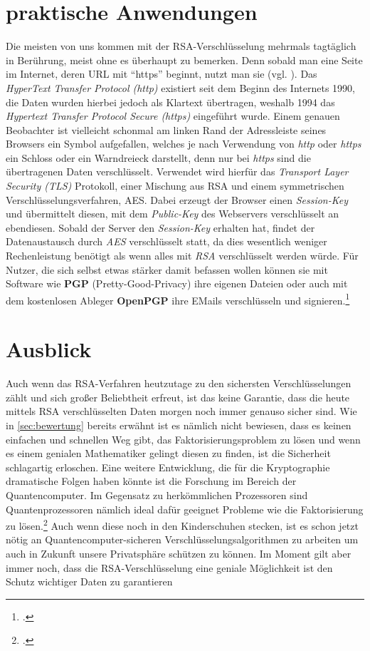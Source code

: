 \documentclass{scrarticle}
\begin{document}
    \section{praktische Anwendungen}
        Die meisten von uns kommen mit der RSA-Verschlüsselung mehrmals tagtäglich in Berührung, meist ohne es überhaupt zu bemerken. Denn sobald man eine Seite im Internet, deren URL mit \enquote{https} beginnt, nutzt man sie (vgl. \cite{httpsblog}). Das \emph{HyperText Transfer Protocol (http)} existiert seit dem Beginn des Internets 1990, die Daten wurden hierbei jedoch als Klartext übertragen, weshalb 1994 das \emph{Hypertext Transfer Protocol Secure (https)} eingeführt wurde. Einem genauen Beobachter ist vielleicht schonmal am linken Rand der Adressleiste seines Browsers ein Symbol aufgefallen, welches je nach Verwendung von \emph{http} oder \emph{https} ein Schloss oder ein Warndreieck darstellt, denn nur bei \emph{https} sind die übertragenen Daten verschlüsselt. Verwendet wird hierfür das \emph{Transport Layer Security (TLS)} Protokoll, einer Mischung aus RSA und einem symmetrischen Verschlüsselungsverfahren, AES. Dabei erzeugt der Browser einen \emph{Session-Key} und übermittelt diesen, mit dem \emph{Public-Key} des Webservers verschlüsselt an ebendiesen. Sobald der Server den \emph{Session-Key} erhalten hat, findet der Datenaustausch durch \emph{AES} verschlüsselt statt, da dies wesentlich weniger Rechenleistung benötigt als wenn alles mit \emph{RSA} verschlüsselt werden würde.
        Für Nutzer, die sich selbst etwas stärker damit befassen wollen können sie mit Software wie \textbf{PGP} (Pretty-Good-Privacy) ihre eigenen Dateien oder auch mit dem kostenlosen Ableger \textbf{OpenPGP} ihre EMails verschlüsseln und signieren.\footcite[vgl.][]{zotero-48}
        
    \section{Ausblick}
        Auch wenn das RSA-Verfahren heutzutage zu den sichersten Verschlüsselungen zählt und sich großer Beliebtheit erfreut, ist das keine Garantie, dass die heute mittels RSA verschlüsselten Daten morgen noch immer genauso sicher sind. Wie in \ref{sec:bewertung} bereits erwähnt ist es nämlich nicht bewiesen, dass es keinen einfachen und schnellen Weg gibt, das Faktorisierungsproblem zu lösen und wenn es einem genialen Mathematiker gelingt diesen zu finden, ist die Sicherheit schlagartig erloschen. Eine weitere Entwicklung, die für die Kryptographie dramatische Folgen haben könnte ist die Forschung im Bereich der Quantencomputer. Im Gegensatz zu herkömmlichen Prozessoren sind Quantenprozessoren nämlich ideal dafür geeignet Probleme wie die Faktorisierung zu lösen.\footcite[vgl.][]{wiedmann} Auch wenn diese noch in den Kinderschuhen stecken, ist es schon jetzt nötig an Quantencomputer-sicheren Verschlüsselungsalgorithmen zu arbeiten um auch in Zukunft unsere Privatsphäre schützen zu können. Im Moment gilt aber immer noch, dass die RSA-Verschlüsselung eine geniale Möglichkeit ist den Schutz wichtiger Daten zu garantieren

    \newpage
    \printbibliography
    \newpage
    
\end{document}
